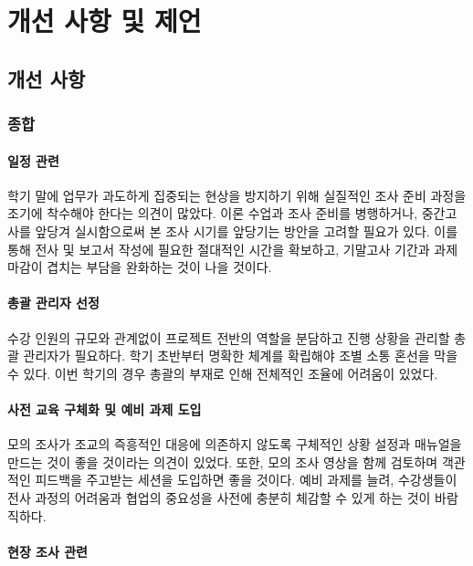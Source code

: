 \chapter{개선 사항 및 제언}

\section{개선 사항}

\subsection{종합}

\subsubsection{일정 관련}

학기 말에 업무가 과도하게 집중되는 현상을 방지하기 위해 실질적인 조사 준비 과정을 조기에 착수해야 한다는 의견이 많았다. 이론 수업과 조사 준비를 병행하거나, 중간고사를 앞당겨 실시함으로써 본 조사 시기를 앞당기는 방안을 고려할 필요가 있다. 이를 통해 전사 및 보고서 작성에 필요한 절대적인 시간을 확보하고, 기말고사 기간과 과제 마감이 겹치는 부담을 완화하는 것이 나을 것이다. 

\subsubsection{총괄 관리자 선정}

수강 인원의 규모와 관계없이 프로젝트 전반의 역할을 분담하고 진행 상황을 관리할 총괄 관리자가 필요하다. 학기 초반부터 명확한 체계를 확립해야 조별 소통 혼선을 막을 수 있다. 이번 학기의 경우 총괄의 부재로 인해 전체적인 조율에 어려움이 있었다.

\subsubsection{사전 교육 구체화 및 예비 과제 도입}

모의 조사가 조교의 즉흥적인 대응에 의존하지 않도록 구체적인 상황 설정과 매뉴얼을 만드는 것이 좋을 것이라는 의견이 있었다. 또한, 모의 조사 영상을 함께 검토하며 객관적인 피드백을 주고받는 세션을 도입하면 좋을 것이다. 예비 과제를 늘려, 수강생들이 전사 과정의 어려움과 협업의 중요성을 사전에 충분히 체감할 수 있게 하는 것이 바람직하다.

\subsubsection{현장 조사 관련}


